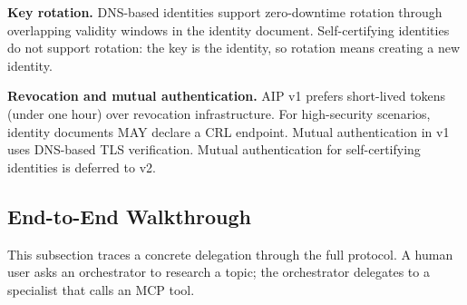 \documentclass[11pt,a4paper]{article}
\newcommand{\aip}{\textsc{AIP}}
\newcommand{\mcp}{\textsc{MCP}}
\begin{document}
\textbf{Key rotation.} DNS-based identities support zero-downtime rotation through overlapping validity windows in the identity document. Self-certifying identities do not support rotation: the key is the identity, so rotation means creating a new identity.

\textbf{Revocation and mutual authentication.} \aip{} v1 prefers short-lived tokens (under one hour) over revocation infrastructure. For high-security scenarios, identity documents MAY declare a CRL endpoint. Mutual authentication in v1 uses DNS-based TLS verification. Mutual authentication for self-certifying identities is deferred to v2.

\subsection{End-to-End Walkthrough}
\label{sec:walkthrough}

This subsection traces a concrete delegation through the full protocol. A human user asks an orchestrator to research a topic; the orchestrator delegates to a specialist that calls an \mcp{} tool.
\end{document}
